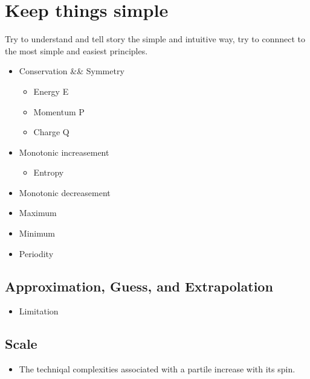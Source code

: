 \section{Keep things simple}
Try to understand and tell story the simple and intuitive way, try to connnect  to the most simple and easiest principles.
\begin{itemize}
    \item Conservation \&\& Symmetry
	\begin{itemize}
	    \item Energy E
	    \item Momentum P
	    \item Charge Q
	\end{itemize}

    \item Monotonic increasement
	\begin{itemize}
	    \item Entropy
	\end{itemize}

    \item Monotonic decreasement

    \item Maximum

    \item Minimum

    \item Periodity
\end{itemize}


\subsection{Approximation, Guess, and Extrapolation}
\begin{itemize}
    \item Limitation
\end{itemize}


\subsection{Scale}
\begin{itemize}
    \item The techniqal complexities associated with a partile increase with its spin.
\end{itemize}


